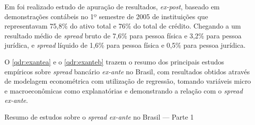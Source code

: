 \documentclass[
  12pt,
  12pt,
  openright,
  oneside,
  a4paper,
  chapter=TITLE,
  section=TITLE,
  subsection=TITLE,
  subsubsection=TITLE,
  portugues,
  sumario=tradicional]{abntex2}
\begin{document}
Em \textcite{fipecafi:2005} foi realizado estudo de apuração de resultados, \emph{ex-post}, baseado em demonstrações contábeis no 1º semestre de 2005 de instituições que representavam 75,8\% do ativo total e 76\% do total de crédito. Chegando a um resultado médio de \emph{spread} bruto de 7,6\% para pessoa física e 3,2\% para pessoa jurídica, e \emph{spread} líquido de 1,6\% para pessoa física e 0,5\% para pessoa jurídica.

O \autoref{qdr:exantea} e o \autoref{qdr:exanteb} trazem o resumo dos principais estudos empíricos sobre \emph{spread} bancário \emph{ex-ante} no Brasil, com resultados obtidos através de modelagem econométrica com utilização de regressão, tomando variáveis micro e macroeconômicas como explanatórias e demonstrando a relação com o \emph{spread ex-ante}.

\begin{qdr}
\vspace{20pt}
\caption{Resumo de estudos sobre o \emph{spread ex-ante} no Brasil — Parte 1}
\vspace{1mm}
\begingroup\fontsize{10}{12}\selectfont


\end{qdr}
\end{document}
